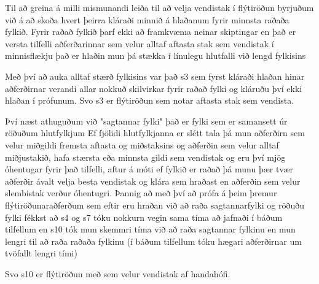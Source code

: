 Til að greina á milli mismunandi leiða til að velja vendistak í flýtiröðun byrjuðum við á að skoða hvert þeirra kláraði minnið á hlaðanum fyrir minnsta raðaða fylkið.
Fyrir raðað fylkið þarf ekki að framkvæma neinar skiptingar en það er versta tilfelli aðferðarinnar sem velur alltaf aftasta stak sem vendistak í minnisflækju það er hlaðin mun þá stækka í línulegu hlutfalli við lengd fylkisins 

Með því að auka alltaf stærð fylkisins var það s3 sem fyrst kláraði hlaðan hinar aðferðirnar verandi allar nokkuð skilvirkar  fyrir raðað fylki og kláruðu því ekki hlaðan í prófunum. Svo s3 er flýtiröðun sem notar aftasta stak sem vendista.

Því næst athuguðum við "sagtannar fylki" það er fylki sem er samansett úr röðuðum hlutfylkjum
Ef fjölidi hlutfylkjanna er slétt tala þá mun aðferðirn sem velur miðgildi fremsta aftasta og miðstaksins og aðferðin sem velur  alltaf miðjustakið, hafa stærsta eða minnsta gildi sem vendistak og eru því mjög óhentugar fyrir það tilfelli, aftur á móti ef fylkið er raðað þá munu þær tvær aðferðir ávalt velja besta vendistak og klára sem hraðast en aðferðin sem velur slembistak verður óhentugri.
Þannig að með því að prófa á þeim þremur flýtiröðunaraðferðum sem eftir eru hraðan við að raða sagtannarfylki og röðuðu fylki fékkst að s4 og s7 tóku nokkurn vegin sama tíma að jafnaði í báðum tilfellum en s10 tók mun skemmri tíma við að raða sagtannar fylkinu en mun lengri til að raða raðaða  fylkinu (í báðum tilfellum tóku hægari aðferðirnar um tvöfallt lengri tími)

Svo s10 er flýtiröðun með sem velur vendistak af handahófi. 
